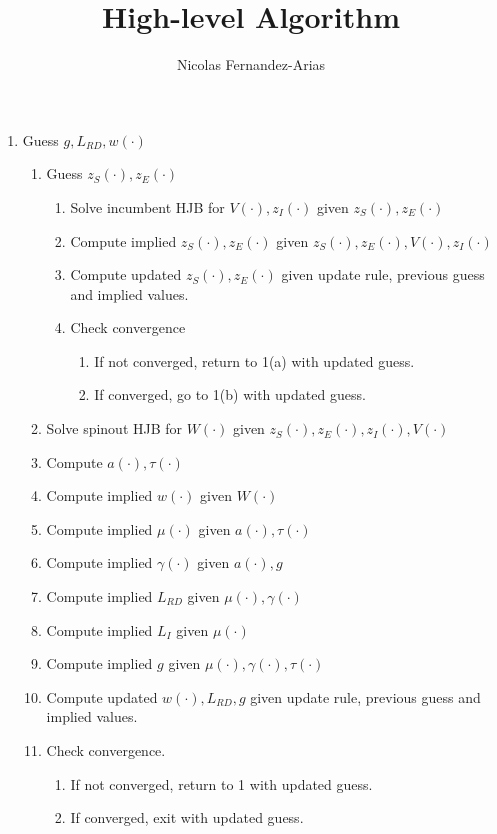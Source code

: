 \documentclass[12pt,english]{article}
\theoremstyle{remark}
\begin{document}
	
\title{High-level Algorithm}
\author{Nicolas Fernandez-Arias}
\maketitle

\begin{enumerate}
	\item Guess $g,L_{RD},w(\cdot)$
	\begin{enumerate}
		\item Guess $z_S(\cdot),z_E(\cdot)$
		\begin{enumerate}
			\item Solve incumbent HJB for $V(\cdot),z_I(\cdot)$ given $z_S(\cdot),z_E(\cdot)$
			\item Compute implied $z_S(\cdot),z_E(\cdot)$ given $z_S(\cdot),z_E(\cdot),V(\cdot),z_I(\cdot)$
			\item Compute updated $z_S(\cdot),z_E(\cdot)$ given update rule, previous guess and implied values.
			\item Check convergence
			\begin{enumerate}
				\item If not converged, return to 1(a) with updated guess.	
				\item If converged, go to 1(b) with updated guess.
			\end{enumerate}
		\end{enumerate}
		\item Solve spinout HJB for $W(\cdot)$ given $z_S(\cdot),z_E(\cdot),z_I(\cdot),V(\cdot)$
		\item Compute $a(\cdot),\tau(\cdot)$
		\item Compute implied $w(\cdot)$ given $W(\cdot)$
		\item Compute implied $\mu(\cdot)$ given $a(\cdot),\tau(\cdot)$
		\item Compute implied $\gamma(\cdot)$ given $a(\cdot),g$
		\item Compute implied $L_{RD}$ given $\mu(\cdot),\gamma(\cdot)$
		\item Compute implied $L_I$ given $\mu(\cdot)$
		\item Compute implied $g$ given $\mu(\cdot),\gamma(\cdot),\tau(\cdot)$
		\item Compute updated $w(\cdot),L_{RD},g$ given update rule, previous guess and implied values.
		\item Check convergence.
		\begin{enumerate}
			\item If not converged, return to 1 with updated guess.
			\item If converged, exit with updated guess.
		\end{enumerate}
	\end{enumerate}
\end{enumerate}
\end{document}
